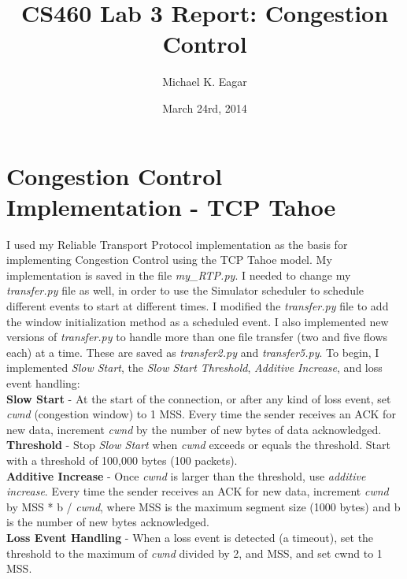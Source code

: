 \documentclass[11pt]{article}
\begin{document}

\title{CS460 Lab 3 Report: Congestion Control}

\author{Michael K. Eagar}

\date{March 24rd, 2014}

\maketitle

\section{Congestion Control Implementation - TCP Tahoe}

I used my Reliable Transport Protocol implementation as the basis for implementing Congestion Control using the TCP Tahoe model. My implementation is saved in the file \textit{my\_RTP.py}. I needed to change my \textit{transfer.py} file as well, in order to use the Simulator scheduler to schedule different events to start at different times. I modified the \textit{transfer.py} file to add the window initialization method as a scheduled event. I also implemented new versions of \textit{transfer.py} to handle more than one file transfer (two and five flows each) at a time. These are saved as \textit{transfer2.py} and \textit{transfer5.py}. To begin, I implemented \textit{Slow Start}, the \textit{Slow Start Threshold}, \textit{Additive Increase}, and loss event handling:\\

\indent \textbf{Slow Start} - At the start of the connection, or after any kind of loss event, set \textit{cwnd} (congestion window) to 1 MSS. Every time the sender receives an ACK for new data, increment \textit{cwnd} by the number of new bytes of data acknowledged.\\
\indent \textbf{Threshold} - Stop \textit{Slow Start} when \textit{cwnd} exceeds or equals the threshold. Start with a threshold of 100,000 bytes (100 packets).\\
\indent \textbf{Additive Increase} - Once \textit{cwnd} is larger than the threshold, use \textit{additive increase}. Every time the sender receives an ACK for new data, increment \textit{cwnd} by MSS * b / \textit{cwnd}, where MSS is the maximum segment size (1000 bytes) and b is the number of new bytes acknowledged.\\
\indent \textbf{Loss Event Handling} - When a loss event is detected (a timeout), set the threshold to the maximum of \textit{cwnd} divided by 2, and MSS, and set cwnd to 1 MSS.\\\\
\end{document}
